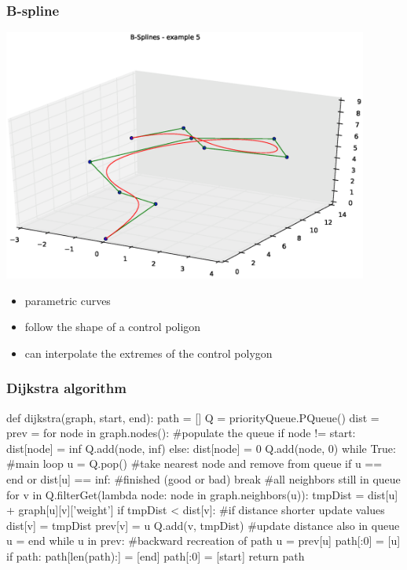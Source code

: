 \begin{frame}
  \frametitle{B-spline}
  \begin{center}
    \includegraphics[width=0.9\textwidth, trim=110 30 50 50, clip]{img/bspline.eps}
  \end{center}
  \pause
  \begin{itemize}
  \item \alert{parametric} curves\pause
  \item follow the shape of a \alert{control poligon}\pause
  \item can interpolate the
    \alert{extremes} of the control polygon
  \end{itemize}
\end{frame}

\begin{frame}[fragile]
  \frametitle{Dijkstra algorithm}
  \begin{pblock}
def dijkstra(graph, start, end):
  path = []
  Q = priorityQueue.PQueue()
  dist = {}
  prev = {}
  for node in graph.nodes(): #populate the queue
    if node != start:
      dist[node] = inf
      Q.add(node, inf)
    else:
      dist[node] = 0
      Q.add(node, 0)
  while True:  #main loop
    u = Q.pop() #take nearest node and remove from queue
    if u == end or dist[u] == inf: #finished (good or bad)
      break
    #all neighbors still in queue
    for v in Q.filterGet(lambda node: node in graph.neighbors(u)):
      tmpDist = dist[u] + graph[u][v]['weight']
      if tmpDist < dist[v]: #if distance shorter update values
        dist[v] = tmpDist
        prev[v] = u
        Q.add(v, tmpDist) #update distance also in queue
  u = end
  while u in prev:  #backward recreation of path
      u = prev[u]
      path[:0] = [u]
  if path:
      path[len(path):] = [end]
      path[:0] = [start]
  return path
  \end{pblock}  
\end{frame}

